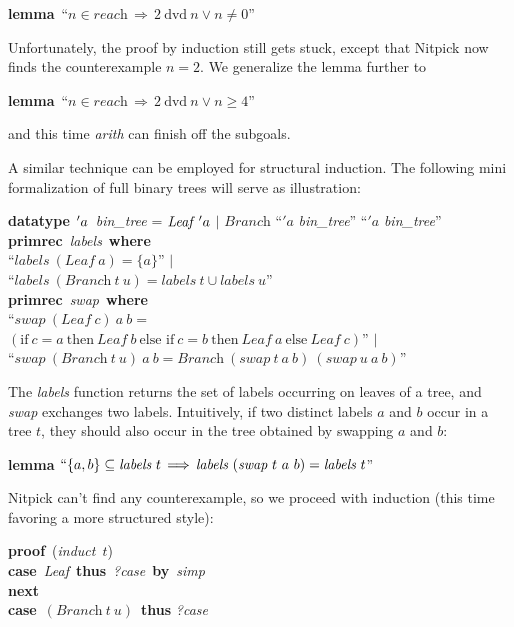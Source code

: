 \documentclass[a4paper,12pt]{article}
\begin{document}
\prew
\textbf{lemma}~``$n \in \textit{reach} \,\Longrightarrow\, 2~\textrm{dvd}~n \mathrel{\lor} n \not= 0$''
\postw

Unfortunately, the proof by induction still gets stuck, except that Nitpick now
finds the counterexample $n = 2$. We generalize the lemma further to

\prew
\textbf{lemma}~``$n \in \textit{reach} \,\Longrightarrow\, 2~\textrm{dvd}~n \mathrel{\lor} n \ge 4$''
\postw

and this time \textit{arith} can finish off the subgoals.

A similar technique can be employed for structural induction. The
following mini formalization of full binary trees will serve as illustration:

\prew
\textbf{datatype} $\kern1pt'a$~\textit{bin\_tree} = $\textit{Leaf}~{\kern1pt'a}$ $\mid$ $\textit{Branch}$ ``\kern1pt$'a$ \textit{bin\_tree}'' ``\kern1pt$'a$ \textit{bin\_tree}'' \\[2\smallskipamount]
\textbf{primrec}~\textit{labels}~\textbf{where} \\
``$\textit{labels}~(\textit{Leaf}~a) = \{a\}$'' $\mid$ \\
``$\textit{labels}~(\textit{Branch}~t~u) = \textit{labels}~t \mathrel{\cup} \textit{labels}~u$'' \\[2\smallskipamount]
\textbf{primrec}~\textit{swap}~\textbf{where} \\
``$\textit{swap}~(\textit{Leaf}~c)~a~b =$ \\
\phantom{``}$(\textrm{if}~c = a~\textrm{then}~\textit{Leaf}~b~\textrm{else~if}~c = b~\textrm{then}~\textit{Leaf}~a~\textrm{else}~\textit{Leaf}~c)$'' $\mid$ \\
``$\textit{swap}~(\textit{Branch}~t~u)~a~b = \textit{Branch}~(\textit{swap}~t~a~b)~(\textit{swap}~u~a~b)$''
\postw

The \textit{labels} function returns the set of labels occurring on leaves of a
tree, and \textit{swap} exchanges two labels. Intuitively, if two distinct
labels $a$ and $b$ occur in a tree $t$, they should also occur in the tree
obtained by swapping $a$ and $b$:

\prew
\textbf{lemma} $``\{a, b\} \subseteq \textit{labels}~t \,\Longrightarrow\, \textit{labels}~(\textit{swap}~t~a~b) = \textit{labels}~t$''
\postw

Nitpick can't find any counterexample, so we proceed with induction
(this time favoring a more structured style):

\prew
\textbf{proof}~(\textit{induct}~$t$) \\
\hbox{}\quad \textbf{case}~\textit{Leaf}~\textbf{thus}~\textit{?case}~\textbf{by}~\textit{simp} \\
\textbf{next} \\
\hbox{}\quad \textbf{case}~$(\textit{Branch}~t~u)$~\textbf{thus} \textit{?case}
\postw
\end{document}
